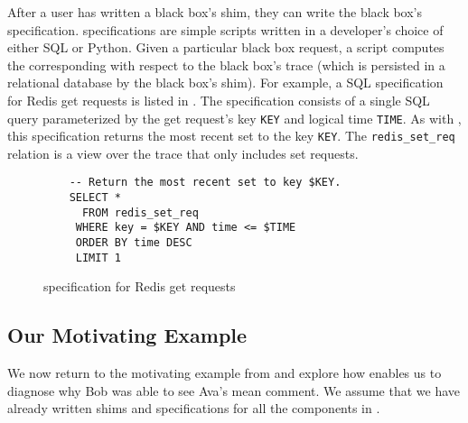 After a user has written a black box's shim, they can write the black box's
\watprovenance{} specification. \fluent{} \watprovenance{} specifications are
simple scripts written in a developer's choice of either SQL or Python. Given a
particular black box request, a \watprovenance{}  script computes the
corresponding \watprovenance{} with respect to the black box's trace (which is
persisted in a relational database by the black box's shim). For example, a SQL
\watprovenance{} specification for Redis get requests is listed in
. The \watprovenance{} specification consists of
a single SQL query parameterized by the get request's key \texttt{KEY} and
logical time \texttt{TIME}. As with , this
\watprovenance{} specification returns the most recent set to the key
\texttt{KEY}. The \texttt{redis\_set\_req} relation is a view over the trace
that only includes set requests.

\begin{figure}[ht]
  \begin{Verbatim}
    -- Return the most recent set to key $KEY.
    SELECT *
      FROM redis_set_req
     WHERE key = $KEY AND time <= $TIME
     ORDER BY time DESC
     LIMIT 1
  \end{Verbatim}
  \caption{\Watprovenance{} specification for Redis get requests}
\end{figure}

\subsection{Our Motivating Example}
\newcommand{\systemname}{ZardozBook}
We now return to the motivating example from  and
explore how \fluent{} enables us to diagnose why Bob was able to see Ava's mean
comment. We assume that we have already written \fluent{} shims and
\watprovenance{} specifications for all the components in .

